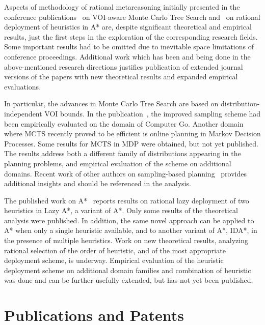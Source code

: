 \documentclass{article}
\begin{document}
Aspects of methodology of rational metareasoning initially
presented in the conference
publications~\cite{TolpinShimony.mcts,HayRussellTolpinShimony.selecting}
on VOI-aware Monte Carlo Tree Search and~\cite{TolpinEtAl.rla}
on rational deployment of heuristics in A* are, despite
significant theoretical and empirical results, just the first
steps in the exploration of the corresponding research fields.
Some important results had to be omitted due to inevitable space
limitations of conference proceedings.  Additional work which
has been and being done in the above-mentioned research directions
justifies publication of extended journal versions of the papers
with new theoretical results and expanded empirical evaluations.  

In particular, the advances in Monte Carlo Tree Search are based on
distribution-independent VOI bounds. In the publication~\cite{HayRussellTolpinShimony.selecting}, the improved
sampling scheme had been empirically evaluated on the domain of
Computer Go.  Another domain where MCTS recently proved to be
efficient is online planning in Markov Decision Processes. Some
results for MCTS in MDP were obtained, but not yet published.
The results address both a different family of distributions
appearing in the planning problems, and empirical evaluation
of the scheme on additional domains. Recent work of other authors
on sampling-based planning~\cite{FeldmanDomshlak.onlinemdp,DomshlakFeldman.uctornot}
provides additional insights and should be referenced in the
analysis. 

The published work on A*~\cite{TolpinEtAl.rla} reports
results on rational lazy deployment
of two heuristics in Lazy A*, a variant of A*. Only some results
of the theoretical analysis were published. In addition, the same
novel approach can be applied to A* when only a single heuristic
available, and to another variant of A*, IDA*, in the presence of
multiple heuristics. Work on new theoretical results, analyzing 
rational selection of the order of heuristic, and of the most
appropriate deployment scheme, is underway. Empirical evaluation
of the heuristic deployment scheme on additional domain families
and combination of heuristic was done and can be further usefully
extended, but has not yet been published.




\clearpage

\section*{Publications and Patents}
\end{document}
